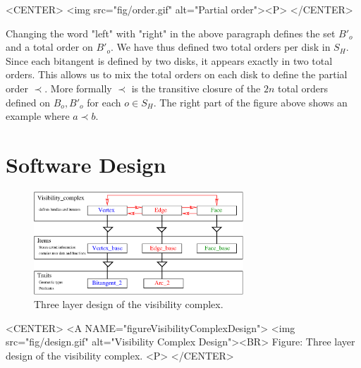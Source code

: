 \begin{ccHtmlOnly}
    <CENTER>
        <img src="fig/order.gif" alt="Partial order"><P>
    </CENTER>
\end{ccHtmlOnly}

Changing the word "left" with "right" in the above paragraph defines the set
$B'_o$ and a total order on $B'_o$. We have thus defined two total orders per
disk in $S_H$. Since each bitangent is defined by two disks, it appears exactly
in two total orders. This allows us to mix the total orders on each disk to
define the partial order $\prec$. More formally $\prec$ is the transitive
closure of the $2n$ total orders defined on $B_o, B'_o$ for each $o \in S_H$.
The right part of the figure above shows an example where $a \prec b$.

\section{Software Design}
\begin{ccTexOnly}
  \begin{figure}
    \begin{center}
      \parbox{0.7\textwidth}{%
          \includegraphics[width=0.7\textwidth]{fig/design.eps}%
      }
    \end{center}
    \caption{Three layer design of the visibility complex.}
    \label{figureVisibilityComplexDesign}
  \end{figure}
\end{ccTexOnly}

\begin{ccHtmlOnly}
    <CENTER>
    <A NAME="figureVisibilityComplexDesign">
        <img src="fig/design.gif"
         alt="Visibility Complex Design"><BR>
    Figure: Three layer design of the visibility complex.
    <P>
    </CENTER>
\end{ccHtmlOnly}

